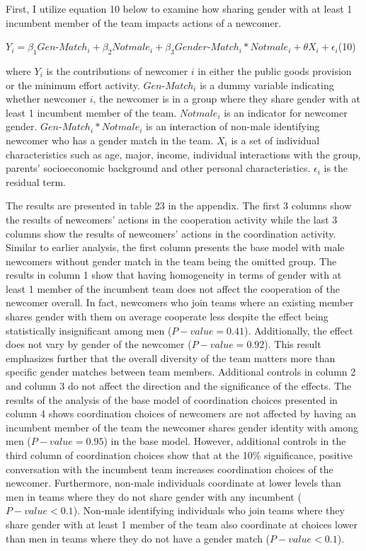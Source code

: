 First, I utilize equation 10 below to examine how sharing gender with at least 1 incumbent member of the team impacts actions of a newcomer. 

\begin{center}
 $Y_{i}=\beta_1Gen$-$Match_{i}+\beta_2Notmale_{i}+\beta_3Gender$-$Match_{i}*Notmale_{i}+\theta X_{i}+\epsilon_{i}$\space (10)
\end{center}


\noindent where $Y_{i}$ is the contributions of newcomer $i$ in either the public goods provision or the minimum effort activity. $Gen$-$Match_{i}$ is a dummy variable indicating whether newcomer $i$, the newcomer is in a group where they share gender with at least 1 incumbent member of the team. $Notmale_{i}$ is an indicator for newcomer gender. $Gen$-$Match_{i}*Notmale_{i}$ is an interaction of non-male identifying newcomer who has a gender match in the team. $X_{i}$ is a set of individual characteristics such as age, major, income, individual interactions with the group, parents' socioeconomic background and other personal characteristics. $\epsilon_{i}$ is the residual term. 

The results are presented in table 23 in the appendix. The first 3 columns show the results of newcomers' actions in the cooperation activity while the last 3 columns show the results of newcomers' actions in the coordination activity. Similar to earlier analysis, the first column presents the base model with male newcomers without gender match in the team being the omitted group.  The results in column 1 show that having homogeneity in terms of gender with at least 1 member of the incumbent team does not affect the cooperation of the newcomer overall. In fact, newcomers who join teams where an existing member shares gender with them on average cooperate less despite the effect being statistically insignificant among men ($P-value=0.41$). Additionally, the effect does not vary by gender of the newcomer ($P-value=0.92$). This result emphasizes further that the overall diversity of the team matters more than specific gender matches between team members. Additional controls in column 2 and column 3 do not affect the direction and the significance of the effects. The results of the analysis of the base model of coordination choices presented in column 4 shows coordination choices of newcomers are not affected by having an incumbent member of the team the newcomer shares gender identity with among men ($P-value=0.95$) in the base model. However, additional controls in the third column of coordination choices show that at the 10\% significance, positive conversation with the incumbent team increases coordination choices of the newcomer. Furthermore, non-male individuals coordinate at lower levels than men in teams where they do not share gender with any incumbent ($P-value<0.1$). Non-male identifying individuals who join teams where they share gender with at least 1 member of the team also coordinate at choices lower than men in teams where they do not have a gender match ($P-value<0.1$).


